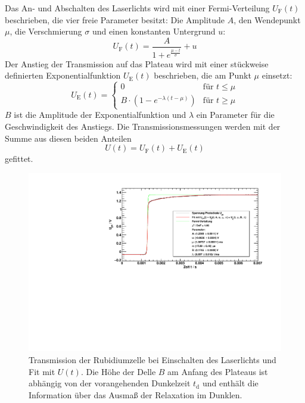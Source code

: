 Das An- und Abschalten des Laserlichts wird mit einer Fermi-Verteilung $U_{\text{F}}(t)$ beschrieben,
die vier freie Parameter besitzt:
Die Amplitude $A$, den Wendepunkt $\mu$, die Verschmierung $\sigma$ und einen konstanten Untergrund $u$:
\begin{equation}
    U_{\text{F}}(t)=\frac{A}{1+e^{\frac{\mu - t}{\sigma}}} + u
\end{equation}
Der Anstieg der Transmission auf das Plateau wird mit einer
stückweise definierten Exponentialfunktion $U_{\text{E}}(t)$
beschrieben, die am Punkt $\mu$ einsetzt:
\begin{equation}
    U_{\text{E}}(t)=
    \begin{cases}
0	& \text{für } t \leq \mu \\
B \cdot \left( 1-e^{-\lambda(t-\mu)} \right)  & \text{für } t \geq \mu
\end{cases}
\end{equation}
$B$ ist die Amplitude der Exponentialfunktion und $\lambda$ ein Parameter für die Geschwindigkeit des Anstiegs.
Die Transmissionsmessungen werden mit der Summe aus diesen beiden Anteilen
\begin{equation}
    \label{eq:fra:fitfunct}
    U(t)= U_{\text{F}}(t)+ U_{\text{E}}(t)
\end{equation}
gefittet.

\begin{figure}[H]
    \begin{center}
        \includegraphics[width=\textwidth]{../img/part6/05.pdf}
        \caption{Transmission der Rubidiumzelle bei Einschalten des Laserlichts und Fit mit $U(t)$.
        Die Höhe der Delle $B$ am Anfang des Plateaus ist abhängig von der vorangehenden Dunkelzeit $t_\text{d}$
        und enthält die Information über das Ausmaß der Relaxation im Dunklen.}
        \label{img:fra:exampletrans}
    \end{center}
\end{figure}

